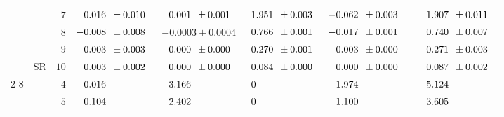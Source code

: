 \begin{table}[htbp]
{\begin{tabular}{ccrrrrrr}
                                                                                  &                         & \cellcolor{gray!10}$7$  & \cellcolor{gray!10}$\hdneg0.016\hddig\pm0.010\hddig$ & \cellcolor{gray!10}$\hdneg0.001\hddig\pm0.001\hddig$ & \cellcolor{gray!10}$\hddig1.951\hddig\pm0.003\hddig$ & \cellcolor{gray!10}${-}0.062\hddig\pm0.003\hddig$    & \cellcolor{gray!10}$\hdneg\hddig1.907\hddig\pm0.011\hddig$ \\
                                                                                  &                         & \cellcolor{gray!10}$8$  & \cellcolor{gray!10}${-}0.008\hddig\pm0.008\hddig$    & \cellcolor{gray!10}${-}0.0003\pm0.0004$              & \cellcolor{gray!10}$\hddig0.766\hddig\pm0.001\hddig$ & \cellcolor{gray!10}${-}0.017\hddig\pm0.001\hddig$    & \cellcolor{gray!10}$\hdneg\hddig0.740\hddig\pm0.007\hddig$ \\
                                                                                  &                         & \cellcolor{gray!10}$9$  & \cellcolor{gray!10}$\hdneg0.003\hddig\pm0.003\hddig$ & \cellcolor{gray!10}$\hdneg0.000\hddig\pm0.000\hddig$ & \cellcolor{gray!10}$\hddig0.270\hddig\pm0.001\hddig$ & \cellcolor{gray!10}${-}0.003\hddig\pm0.000\hddig$    & \cellcolor{gray!10}$\hdneg\hddig0.271\hddig\pm0.003\hddig$ \\
                                                                                  & \multirow{-7}{*}{SR}    & \cellcolor{gray!10}$10$ & \cellcolor{gray!10}$\hdneg0.003\hddig\pm0.002\hddig$ & \cellcolor{gray!10}$\hdneg0.000\hddig\pm0.000\hddig$ & \cellcolor{gray!10}$\hddig0.084\hddig\pm0.000\hddig$ & \cellcolor{gray!10}$\hdneg0.000\hddig\pm0.000\hddig$ & \cellcolor{gray!10}$\hdneg\hddig0.087\hddig\pm0.002\hddig$ \\
      \cmidrule(l){2-8}
                                                                                  &                         & $4$                     & ${-}0.016\hddig\phantom{{}\pm0.0000}$                & $\hdneg3.166\hddig\phantom{{}\pm0.0000}$             & $\hddig0\phantom{.0000}\phantom{{}\pm0.0000}$        & $\hdneg1.974\hddig\phantom{{}\pm0.0000}$             & $\hdneg\hddig5.124\hddig\phantom{{}\pm0.0000}$             \\
                                                                                  &                         & $5$                     & $\hdneg0.104\hddig\phantom{{}\pm0.0000}$             & $\hdneg2.402\hddig\phantom{{}\pm0.0000}$             & $\hddig0\phantom{.0000}\phantom{{}\pm0.0000}$        & $\hdneg1.100\hddig\phantom{{}\pm0.0000}$             & $\hdneg\hddig3.605\hddig\phantom{{}\pm0.0000}$             \\

\end{tabular}}
\end{table}
